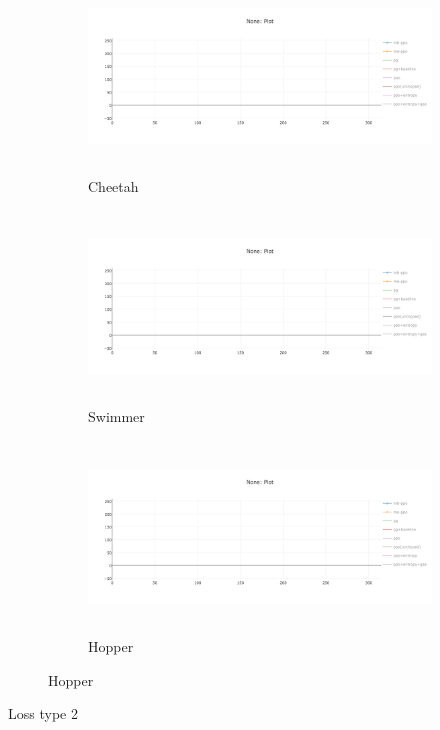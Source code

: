 \documentclass[10pt]{article}
\begin{document}
\begin{figure}[ht!]
    \centering
    \begin{subfigure}[h]{0.6\linewidth}
        \centering
        \includegraphics[height=2in]{figures/newplot.png}
        \caption{Cheetah}
    \end{subfigure}
    \vskip 0.3in
    \begin{subfigure}[h]{0.6\textwidth}
        \centering
        \includegraphics[height=2in]{figures/newplot.png}
        \caption{Swimmer}
    \end{subfigure}
    \vskip 0.3in
    \begin{subfigure}[h]{0.6\textwidth}
        \centering
        \includegraphics[height=2in]{figures/newplot.png}
        \caption{Hopper}
    \end{subfigure}
\end{figure}
\clearpage
Loss type 2
\end{document}

